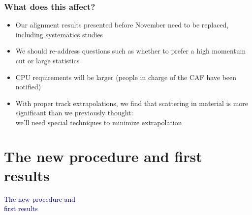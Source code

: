 \documentclass[compress]{beamer}
\begin{document}
\begin{frame}
\frametitle{What does this affect?}
\begin{itemize}\setlength{\itemsep}{0.5 cm}
\item Our alignment results presented before November need
to be replaced, including systematics studies
\item We should re-address questions such as whether to prefer a high
momentum cut or large statistics
\item CPU requirements will be larger (people in charge of the CAF have been notified)
\item With proper track extrapolations, we find that scattering
in material is more significant than we previously thought: \\ we'll
need special techniques to minimize extrapolation
\end{itemize}
\end{frame}

\section*{The new procedure and first results}

\begin{frame}
\begin{center}
\Huge \textcolor{darkblue}{The new procedure and \\ first results}
\end{center}
\end{frame}
\end{document}
